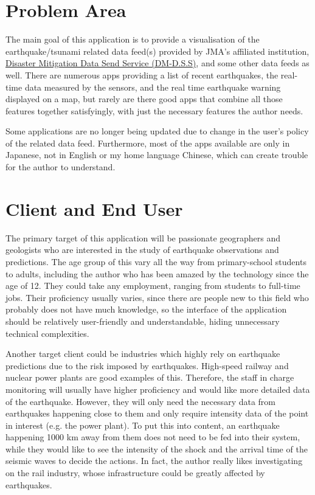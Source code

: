 \section{Problem Area}
The main goal of this application is to provide a visualisation of the earthquake/tsunami related data feed(s) provided by JMA's affiliated institution, \href{https://dmdata.jp}{Disaster Mitigation Data Send Service (DM-D.S.S)}, and some other data feeds as well. There are numerous apps providing a list of recent earthquakes, the real-time data measured by the sensors, and the real time earthquake warning displayed on a map, but rarely are there good apps that combine all those features together satisfyingly, with just the necessary features the author needs.

Some applications are no longer being updated due to change in the user's policy of the related data feed. Furthermore, most of the apps available are only in Japanese, not in English or my home language Chinese, which can create trouble for the author to understand.

\section{Client and End User}
The primary target of this application will be passionate geographers and geologists who are interested in the study of earthquake observations and predictions. The age group of this vary all the way from primary-school students to adults, including the author who has been amazed by the technology since the age of 12. They could take any employment, ranging from students to full-time jobs. Their proficiency usually varies, since there are people new to this field who probably does not have much knowledge, so the interface of the application should be relatively user-friendly and understandable, hiding unnecessary technical complexities.

Another target client could be industries which highly rely on earthquake predictions due to the risk imposed by earthquakes. High-speed railway and nuclear power plants are good examples of this. Therefore, the staff in charge monitoring will usually have higher proficiency and would like more detailed data of the earthquake. However, they will only need the necessary data from earthquakes happening close to them and only require intensity data of the point in interest (e.g. the power plant). To put this into content, an earthquake happening 1000 km away from them does not need to be fed into their system, while they would like to see the intensity of the shock and the arrival time of the seismic waves to decide the actions. In fact, the author really likes investigating on the rail industry, whose infrastructure could be greatly affected by earthquakes.

